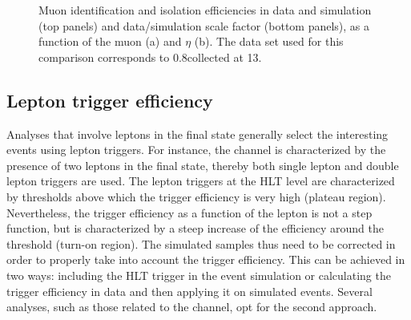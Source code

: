 \begin{figure}[htb]
\centering
{}
\caption{Muon identification and isolation efficiencies in data and simulation (top panels) and data/simulation scale factor (bottom panels), as a function of the muon \pt (a) and $\eta$ (b). The data set used for this comparison corresponds to 0.8\ifb collected at 13\TeV.}\label{fig:muIdIso}
\end{figure}	


\subsection{Lepton trigger efficiency}\label{sec:trigeff}
Analyses that involve leptons in the final state generally select the interesting events using lepton triggers. For instance, the \hwwllnn channel is characterized by the presence of two leptons in the final state, thereby both single lepton and double lepton triggers are used. The lepton triggers at the HLT level are characterized by \pt thresholds above which the trigger efficiency is very high (plateau region). Nevertheless, the trigger efficiency as a function of the lepton \pt is not a step function, but is characterized by a steep increase of the efficiency around the \pt threshold (turn-on region). The simulated samples thus need to be corrected in order to properly take into account the trigger efficiency. This can be achieved in two ways: including the HLT trigger in the event simulation or calculating the trigger efficiency in data and then applying it on simulated events. Several analyses, such as those related to the \hwwllnn channel, opt for the second approach.

